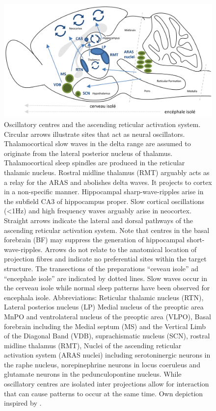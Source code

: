 \begin{figure}[th]
\centering
\includegraphics[width=\textwidth,height=\textheight,keepaspectratio]{Figures/oscillatory_centres_and_the_ascending_reticular_activation_system}
\decoRule
\caption[Oscillatory centres and the ascending reticular activation system]{Oscillatory centres and the ascending reticular activation system.\\
Circular arrows illustrate sites that act as neural oscillators. Thalamocortical slow waves in the delta range are assumed to originate from the lateral posterior nucleus of thalamus. Thalamocortical sleep spindles are produced in the reticular thalamic nucleus. Rostral midline thalamus (RMT) arguably acts as a relay for the ARAS and abolishes delta waves. It projects to cortex in a non-specific manner. Hippocampal sharp-wave-ripples arise in the subfield CA3 of hippocampus proper. Slow cortical oscillations (<1Hz) and high frequency waves arguably arise in neocortex. Straight arrows indicate the lateral and dorsal pathways of the ascending reticular activation system. Note that centres in the basal forebrain (BF) may suppress the generation of hippocampal short-wave-ripples. Arrows do not relate to the anatomical location of projection fibres and indicate no preferential sites within the target structure. The transections of the preparations “ceveau isole” ad “encephale isole” are indicated by dotted lines. Slow waves occur in the cerveau isole while normal sleep patterns have been observed for encephala isole. Abbreviations: Reticular thalamic nucleus (RTN), Lateral posterios nucleus (LP) Medial nucleus of the preoptic area MnPO and ventrolateral nucleus of the preoptic area (VLPO),  Basal forebrain including the
Medial septum (MS) and the Vertical Limb of the Diagonal Band (VDB), suprachismatic nucleus (SCN), rostral midline thalamus (RMT), Nuclei of the ascending reticular activation system (ARAS nuclei) including serotoninergic neurons in the raphe nucleus, norepinephrine neurons in locus coeruleus and glutamate neurons in the pedunculopontine nucleus. While oscillatory centres are isolated inter projections allow for interaction that can cause patterns to occur at the same time. Own depiction inspired by \parencite[1099]{brown2012control}.}
\label{fig:oscillatory_centres_and_the_ascending_reticular_activation_system}
\end{figure}

